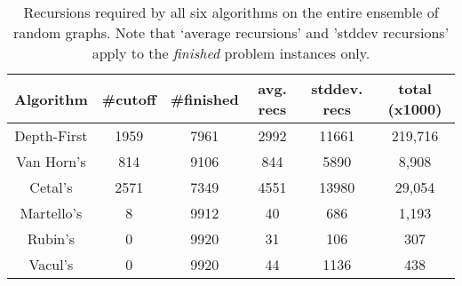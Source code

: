 \begin{table*}[hb]
    
     \centering
 \begin{tabular}{|c|c|c|c|c|c|}
 \hline
     \rowcolor{decreasered}\textbf{Algorithm} & \textbf{\#cutoff} & \textbf{\#finished} & \textbf{avg. recs} & \textbf{stddev. recs} & \textbf{total (x1000)}\\
     \hline
     \hline
      \rowcolor{tablegray}Depth-First & 1959 & 7961 & 2992 & 11661 & 219,716 \\
      \rowcolor{tablegray}Van Horn's & 814 & 9106 & 844 & 5890 & 8,908\\
      \rowcolor{tablegray}Cetal's & 2571& 7349 & 4551 & 13980 & 29,054 \\
      \rowcolor{tablegray}Martello's & 8 & 9912 & 40 & 686 & 1,193 \\
      \rowcolor{tablegray}Rubin's & 0 & 9920 & 31 & 106 & 307 \\
      \rowcolor{tablegray}Vacul's & 0 & 9920 & 44 & 1136 & 438  \\
 \hline
 \end{tabular}
 
 \caption{Recursions required by all six algorithms on the entire ensemble of random graphs. Note that `average recursions' and 'stddev recursions' apply to the \textit{finished} problem instances only.}
 \label{table:results_recursions}
\end{table*}


